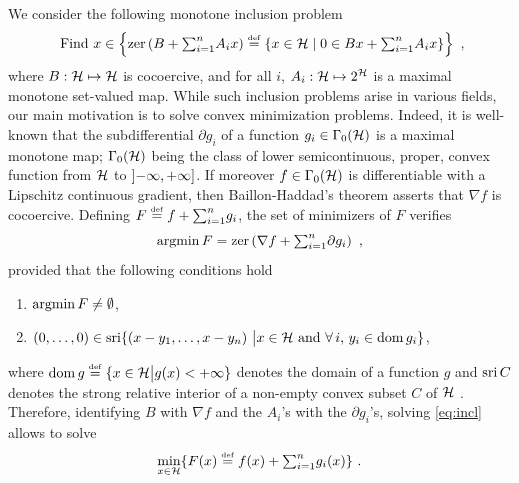 We consider the following monotone inclusion problem
%
\begin{equation}\label{eq:incl}
	\sobjs{Find} x \in \left\{ \zer \pa{ B + \textsum{i=1}{n} A_i x } \eqdef \setdef{ x \in \Hh }{ 0 \in B x + \textsum{i=1}{n} A_i x } \right\}~,
\end{equation}
%
where $B : \mathcal{H} \mapsto \mathcal{H}$ is cocoercive, and for all $i$, $A_i : \mathcal{H} \mapsto 2^{\mathcal{H}}$ is a maximal monotone set-valued map.
While such inclusion problems arise in various fields, our main motivation is to solve convex minimization problems. Indeed, it is well-known that the subdifferential $\partial g_i$ of a function $g_i \in \Gamma_0(\mathcal{H})$ is a maximal monotone map; $\Gamma_0(\mathcal{H})$ being the class of lower semicontinuous, proper, convex function from $\mathcal{H}$ to $]{-}\infty,{+}\infty]$. If moreover $f \in \Gamma_0(\mathcal{H})$ is differentiable with a Lipschitz continuous gradient, then Baillon-Haddad's theorem \cite{BaillonHaddad77} asserts that $\nabla f$ is cocoercive. Defining $F \stackrel{\mathrm{\scriptscriptstyle{def}}}{=} f + {\textstyle \sum_{i=1}^{n}} g_i$, the set of minimizers of $F$ verifies
%
\[
	\operatorname{argmin} F = \operatorname{zer} \left(  \nabla f + {\textstyle \sum_{i=1}^{n}} \partial g_i  \right)~,
\]
%
provided that the following conditions hold
%
\begin{enumerate}[label={\rm (H\arabic{*})}, ref={\rm (H\arabic{*})}]
\item \label{H:argmin} $\operatorname{argmin} F \neq \emptyset$,
\item \label{H:sri} $(0,\ldots,0) \in \operatorname{sri}\{(x-y_1,\ldots,x-y_n) ~ \big | x \in \mathcal{H} ~\text{and}~ \forall \, i, \, y_i \in \operatorname{dom} g_i\}$,
\end{enumerate}
%
where $\operatorname{dom} g \stackrel{\mathrm{\scriptscriptstyle{def}}}{=} \{x \in \mathcal{H} \big | g(x) < {+}\infty\}$ denotes the domain of a function $g$ and $\operatorname{sri} C$ denotes the strong relative interior of a non-empty convex subset $C$ of $\mathcal{H}$ \cite{BauschkeCombettes11}. Therefore, identifying $B$ with $\nabla f$ and the $A_i$'s with the $\partial g_i$'s, solving \eqref{eq:incl} allows to solve
%
\begin{equation}\label{eq:min}
	\umin{x \in \Hh} \{ F(x) \eqdef f(x) + \textsum{i=1}{n} g_i(x) \}~.
\end{equation}
%

